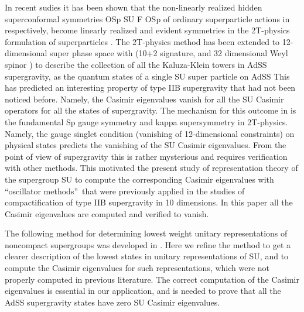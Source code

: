 \documentclass[a4paper,aps,preprint,nofootinbib]{revtex4}
\begin{document}
In recent sudies it has been shown that the non-linearly realized
hidden superconformal symmetries OSp\coordHE{}
SU\coordHE{} F\coordHE{} OSp\coordHE{}
of ordinary superparticle actions in \coordHE{} respectively,
become linearly realized and evident symmetries in the 2T-physics
formulation of superparticles \cite{super2t}\cite{survey2T} . The
2T-physics method has been extended to 12-dimensional super phase
space \coordHE{} with (10+2 signature,
and 32 dimensional Weyl spinor \myHighlight{$\Theta $}\coordHE{}) to describe the
collection of all the Kaluza-Klein towers in AdS\coordHE{}S\coordHE{} supergravity, as the quantum states of a single SU\coordHE{} super particle on AdS\coordHE{}S\coordHE{}
\cite{survey2T}\cite{AdS5S5}\coordHE{} This has predicted an interesting
property of type IIB supergravity that had not been noticed
before. Namely, the Casimir eigenvalues vanish for all the
SU\coordHE{} Casimir operators for all the states of
supergravity. The mechanism for this outcome in \cite{AdS5S5} is
the fundamental Sp\myHighlight{$\left( 2\right) $}\coordHE{} gauge symmetry and kappa
supersymmetry in 2T-physics. Namely, the gauge singlet condition
(vanishing of 12-dimensional constraints) on physical states
predicts the vanishing of the SU\coordHE{} Casimir
eigenvalues. From the point of view of supergravity this is rather
mysterious and requires verification with other methods. This
motivated the present study of representation theory of the
supergroup SU\coordHE{} to compute the corresponding
Casimir eigenvalues with \textquotedblleft oscillator
methods\textquotedblright\ that were previously applied in the
studies of compactification of type IIB supergravity in 10
dimensions. In this paper all the Casimir eigenvalues are computed
and verified to vanish.

The following method for determining lowest weight unitary
representations of noncompact supergroups was developed in
\cite{barsgunaydin}. Here we refine the method to get a clearer
description of the lowest states in unitary representations of
SU\coordHE{}, and to compute the Casimir eigenvalues
for such representations, which were not properly computed in
previous literature. The correct computation of the Casimir
eigenvalues is essential in our application, and is needed to
prove that all the AdS\coordHE{}S\coordHE{} supergravity states have
zero SU\coordHE{} Casimir eigenvalues.
\end{document}
